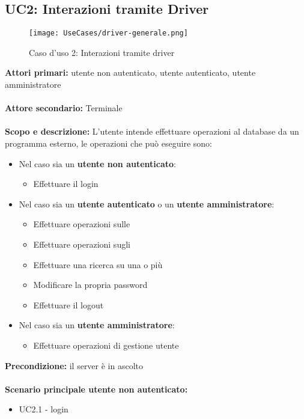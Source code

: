 \documentclass{scalatekids-article}
\begin{document}
\subsection{UC2: Interazioni tramite Driver}
\begin{figure}[H]
  \begin{center}
    \texttt{[image: UseCases/driver-generale.png]}
    \caption*{Caso d'uso 2: Interazioni tramite driver}
  \end{center}
\end{figure}
\textbf{Attori primari:} utente non autenticato, utente autenticato, utente amministratore\\ \\
\textbf{Attore secondario:} Terminale\\ \\
\textbf{Scopo e descrizione:} L'utente intende effettuare operazioni al database da un programma  esterno, le operazioni che può eseguire sono:
\begin{itemize}
  \item Nel caso sia un \textbf{utente non autenticato}:
  \begin{itemize}
    \item Effettuare il login
  \end{itemize}
  \item Nel caso sia un \textbf{utente autenticato} o un \textbf{utente amministratore}:
  \begin{itemize}
    \item Effettuare operazioni sulle 
    \item Effettuare operazioni sugli 
    \item Effettuare una ricerca su una o più 
    \item Modificare la propria password
    \item Effettuare il logout
  \end{itemize}
  \item Nel caso sia un \textbf{utente amministratore}:
  \begin{itemize}
    \item Effettuare operazioni di gestione utente
  \end{itemize}
\end{itemize}
\textbf{Precondizione:} il server è in ascolto\\ \\
\textbf{Scenario principale utente non autenticato:} 
\begin{itemize}
  \item UC2.1 - login
\end{itemize}
\end{document}
